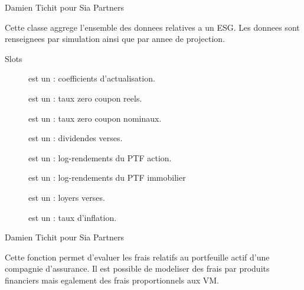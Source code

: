 \documentclass[a4paper]{book}
\begin{document}
%
\begin{Author}\relax
Damien Tichit pour Sia Partners
\end{Author}
%
\begin{Description}\relax
Cette classe aggrege l'ensemble des donnees relatives  a un ESG. Les donnees sont renseignees par simulation ainsi que par annee de projection.
\end{Description}
%
\begin{Section}{Slots}

\begin{description}

\item[] est un  : coefficients d'actualisation.

\item[] est un  : taux zero coupon reels.

\item[] est un  : taux zero coupon nominaux.

\item[] est un  : dividendes verses.

\item[] est un  : log-rendements du PTF action.

\item[] est un  : log-rendements du PTF immobilier

\item[] est un  : loyers verses.

\item[] est un  : taux d'inflation.

\end{description}
\end{Section}
%
\begin{Author}\relax
Damien Tichit pour Sia Partners
\end{Author}
%
\begin{Description}\relax
Cette fonction permet d'evaluer les frais relatifs au portfeuille actif d'une compagnie d'assurance. Il est possible de modeliser des frais par produits financiers
mais egalement des frais proportionnels aux VM.
\end{Description}
\end{document}
